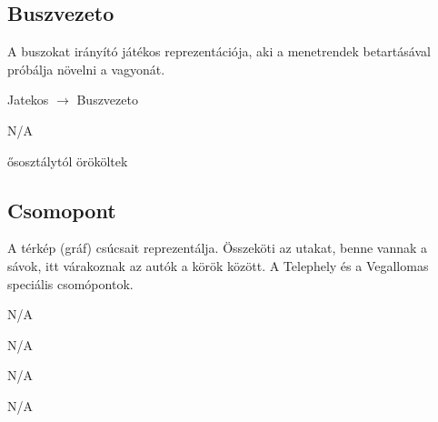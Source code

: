 \subsection{Buszvezeto}
\begin{class-template-responsibility}
    A buszokat irányító játékos reprezentációja, aki a menetrendek betartásával próbálja növelni a vagyonát.
\end{class-template-responsibility}
\begin{class-template-baseclass}
    Jatekos $\rightarrow$ Buszvezeto
\end{class-template-baseclass}
\begin{class-template-interface}
    N/A
\end{class-template-interface}
\begin{class-template-attribute}
\end{class-template-attribute}
\begin{class-template-method}
    ősosztálytól örököltek
\end{class-template-method}

\subsection{Csomopont}
\begin{class-template-responsibility}
    A térkép (gráf) csúcsait reprezentálja. Összeköti az utakat, benne vannak a sávok, itt várakoznak az autók a körök között. A Telephely és a Vegallomas speciális csomópontok.
\end{class-template-responsibility}
\begin{class-template-baseclass}
    N/A
\end{class-template-baseclass}
\begin{class-template-interface}
    N/A
\end{class-template-interface}
\begin{class-template-attribute}
    N/A
\end{class-template-attribute}
\begin{class-template-method}
    N/A
\end{class-template-method}

